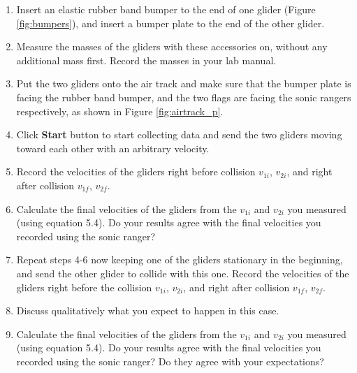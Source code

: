 \begin{enumerate}
\item Insert an elastic rubber band bumper to the end of one glider (Figure \ref{fig:bumpers}), and insert a bumper plate to the end of the other glider. 
\item Measure the masses of the gliders with these accessories on, without any additional mass first. Record the masses in your lab manual. 
\item Put the two gliders onto the air track and make sure that the bumper plate is facing the rubber band bumper, and the two flags are facing the sonic rangers respectively, as shown in Figure \ref{fig:airtrack_p}. 
\item Click \textbf{Start} button to start collecting data and send the two gliders moving toward each other with an arbitrary velocity. 
\item Record the velocities of the gliders right before collision $v_{1i}$, $v_{2i}$, and right after collision $v_{1f}$, $v_{2f}$. 
    \item Calculate the final velocities of the gliders from the $v_{1i}$ and $v_{2i}$ you measured (using equation 5.4). Do your results agree with the final velocities you recorded using the sonic ranger? 

\item Repeat steps 4-6 now keeping one of the gliders stationary in the beginning, and send the other glider to collide with this one. Record the velocities of the gliders right before the collision $v_{1i}$, $v_{2i}$, and right after collision $v_{1f}$, $v_{2f}$.
\item Discuss qualitatively what you expect to happen in this case.
    \item Calculate the final velocities of the gliders from the $v_{1i}$ and $v_{2i}$ you measured (using equation 5.4). Do your results agree with the final velocities you recorded using the sonic ranger? Do they agree with your expectations?


\end{enumerate}
